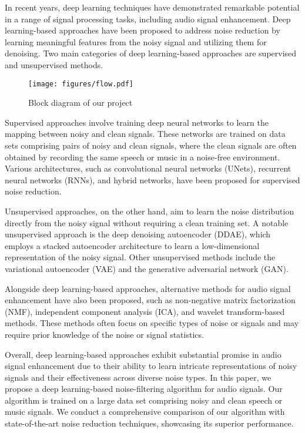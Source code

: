 \documentclass[conference]{IEEEtran}
\begin{document}
In recent years, deep learning techniques have demonstrated remarkable potential in a range of signal processing tasks, including audio signal enhancement.\cite{nicolson2019deep} Deep learning-based approaches have been proposed to address noise reduction by learning meaningful features from the noisy signal and utilizing them for denoising. Two main categories of deep learning-based approaches are supervised and unsupervised methods.

\begin{figure*}[t!]
    \centering
    \texttt{[image: figures/flow.pdf]}
    \caption{Block diagram of our project}
    \label{fig:fig1}
\end{figure*}

Supervised approaches involve training deep neural networks to learn the mapping between noisy and clean signals.\cite{michelsanti2021overview} These networks are trained on data sets comprising pairs of noisy and clean signals, where the clean signals are often obtained by recording the same speech or music in a noise-free environment. Various architectures, such as convolutional neural networks (UNets), recurrent neural networks (RNNs), and hybrid networks, have been proposed for supervised noise reduction.

Unsupervised approaches, on the other hand, aim to learn the noise distribution directly from the noisy signal without requiring a clean training set.\cite{tan2021towards} A notable unsupervised approach is the deep denoising autoencoder (DDAE), which employs a stacked autoencoder architecture to learn a low-dimensional representation of the noisy signal. Other unsupervised methods include the variational autoencoder (VAE) and the generative adversarial network (GAN).

Alongside deep learning-based approaches, alternative methods for audio signal enhancement have also been proposed, such as non-negative matrix factorization (NMF), independent component analysis (ICA), and wavelet transform-based methods.\cite{pandey2020cross} These methods often focus on specific types of noise or signals and may require prior knowledge of the noise or signal statistics.

Overall, deep learning-based approaches exhibit substantial promise in audio signal enhancement due to their ability to learn intricate representations of noisy signals and their effectiveness across diverse noise types.\cite{xu2013experimental} In this paper, we propose a deep learning-based noise-filtering algorithm for audio signals. Our algorithm is trained on a large data set comprising noisy and clean speech or music signals. We conduct a comprehensive comparison of our algorithm with state-of-the-art noise reduction techniques, showcasing its superior performance.
\end{document}
